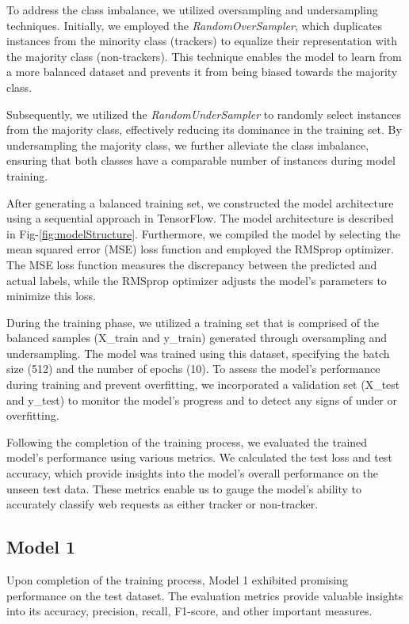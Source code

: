 To address the class imbalance, we utilized oversampling and undersampling techniques. Initially, we employed the \emph{RandomOverSampler},
which duplicates instances from the minority class (trackers) to equalize their representation with the majority class (non-trackers).
This technique enables the model to learn from a more balanced dataset and prevents it from being biased towards the majority class.

Subsequently, we utilized the \emph{RandomUnderSampler} to randomly select instances from the majority class, effectively reducing its
dominance in the training set. By undersampling the majority class, we further alleviate the class imbalance, ensuring that both
classes have a comparable number of instances during model training.

After generating a balanced training set, we constructed the model architecture using a sequential approach in TensorFlow.
The model architecture is described in Fig-\ref{fig:modelStructure}.
Furthermore, we compiled the model by selecting the mean squared
error (MSE) loss function and employed the RMSprop optimizer. The MSE loss function measures the discrepancy between the predicted
and actual labels, while the RMSprop optimizer adjusts the model's parameters to minimize this loss.

During the training phase, we utilized a training set that is comprised of the balanced samples (X\_train and y\_train) generated
through oversampling and undersampling. The model was trained using this dataset, specifying the batch size (512) and the number
of epochs (10). To assess the model's performance during training and prevent overfitting, we incorporated a validation set
(X\_test and y\_test) to monitor the model's progress and to detect any signs of under or overfitting.

Following the completion of the training process, we evaluated the trained model's performance using various metrics.
We calculated the test loss and test accuracy, which provide insights into the model's overall performance on the unseen
test data. These metrics enable us to gauge the model's ability to accurately classify web requests as either tracker
or non-tracker.

\subsection{Model 1}

Upon completion of
the training process, Model 1 exhibited promising performance on the test dataset. The evaluation metrics provide valuable insights
into its accuracy, precision, recall, F1-score, and other important measures.


